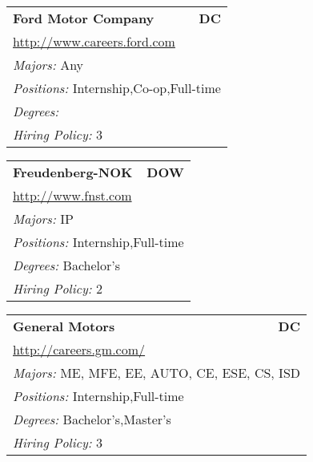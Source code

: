 \documentclass[twoside]{article}
\begin{document}
\begin{center}
\begin{multicols}{3}
\begin{FlushLeft}
\begin{minipage}{.9\columnwidth}
\end{minipage}
 
\begin{minipage}{.9\columnwidth}\begin{tabularx}{.95\columnwidth}{Xr}
                 {\Large\bf Ford Motor Company} & {\Large\bf DC}\\
    \multicolumn{2}{p{.95\columnwidth}}{\url{http://www.careers.ford.com}}\\
    \multicolumn{2}{p{.95\columnwidth}}{\emph{Majors:} Any}\\
    \multicolumn{2}{p{.95\columnwidth}}{\emph{Positions:} Internship,Co-op,Full-time}\\
    \multicolumn{2}{p{.95\columnwidth}}{\emph{Degrees:} }\\
    \multicolumn{2}{p{.95\columnwidth}}{\emph{Hiring Policy:} 3}\\
    \end{tabularx}
    
\end{minipage}
 
\begin{minipage}{.9\columnwidth}\begin{tabularx}{.95\columnwidth}{Xr}
                 {\Large\bf Freudenberg-NOK} & {\Large\bf DOW}\\
    \multicolumn{2}{p{.95\columnwidth}}{\url{http://www.fnst.com}}\\
    \multicolumn{2}{p{.95\columnwidth}}{\emph{Majors:} IP}\\
    \multicolumn{2}{p{.95\columnwidth}}{\emph{Positions:} Internship,Full-time}\\
    \multicolumn{2}{p{.95\columnwidth}}{\emph{Degrees:} Bachelor's}\\
    \multicolumn{2}{p{.95\columnwidth}}{\emph{Hiring Policy:} 2}\\
    \end{tabularx}
    
\end{minipage}
 
\begin{minipage}{.9\columnwidth}\begin{tabularx}{.95\columnwidth}{Xr}
                 {\Large\bf General Motors} & {\Large\bf DC}\\
    \multicolumn{2}{p{.95\columnwidth}}{\url{http://careers.gm.com/}}\\
    \multicolumn{2}{p{.95\columnwidth}}{\emph{Majors:} ME, MFE, EE, AUTO, CE, ESE, CS, ISD}\\
    \multicolumn{2}{p{.95\columnwidth}}{\emph{Positions:} Internship,Full-time}\\
    \multicolumn{2}{p{.95\columnwidth}}{\emph{Degrees:} Bachelor's,Master's}\\
    \multicolumn{2}{p{.95\columnwidth}}{\emph{Hiring Policy:} 3}\\
    \end{tabularx}
    

\end{minipage}
\end{FlushLeft}
\end{multicols}
\end{center}
\end{document}
